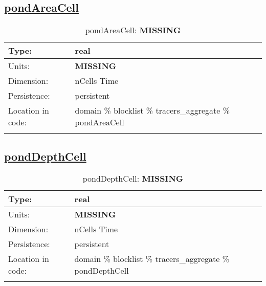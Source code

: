 \subsection[pondAreaCell]{\hyperref[sec:var_tab_tracers_aggregate]{pondAreaCell}}
\label{subsec:var_sec_tracers_aggregate_pondAreaCell}
\begin{center}
\begin{longtable}{| p{2.0in} | p{4.0in} |}
        \hline 
        Type: & real \\
        \hline 
        Units: & {\bf \color{red} MISSING} \\
        \hline 
        Dimension: & nCells Time \\
        \hline 
        Persistence: & persistent \\
        \hline 
         Location in code: & domain \% blocklist \% tracers\_aggregate \% pondAreaCell \\
         \hline 
    \caption{pondAreaCell: {\bf \color{red} MISSING}}
\end{longtable}
\end{center}
\subsection[pondDepthCell]{\hyperref[sec:var_tab_tracers_aggregate]{pondDepthCell}}
\label{subsec:var_sec_tracers_aggregate_pondDepthCell}
\begin{center}
\begin{longtable}{| p{2.0in} | p{4.0in} |}
        \hline 
        Type: & real \\
        \hline 
        Units: & {\bf \color{red} MISSING} \\
        \hline 
        Dimension: & nCells Time \\
        \hline 
        Persistence: & persistent \\
        \hline 
         Location in code: & domain \% blocklist \% tracers\_aggregate \% pondDepthCell \\
         \hline 
    \caption{pondDepthCell: {\bf \color{red} MISSING}}
\end{longtable}
\end{center}

